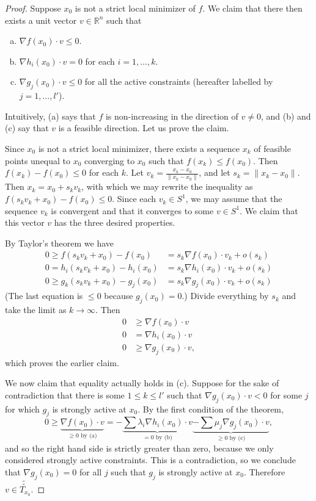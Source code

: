 \documentclass[11pt]{article}
\newcommand{\R}{\mathbb{R}}
\begin{document}
\begin{proof}
Suppose $x_0$ is not a strict local minimizer of $f$. We claim that there then exists a unit vector $v \in \R^n$ such that
\begin{enumerate}[(a)]
\item $\nabla f(x_0) \cdot v \leq 0$.
\item $\nabla h_i(x_0) \cdot v = 0$ for each $i = 1, \dots, k$.
\item $\nabla g_j(x_0) \cdot v \leq 0$ for all the active constraints (hereafter labelled by $j = 1,\dots, l'$).
\end{enumerate}
Intuitively, (a) says that $f$ is non-increasing in the direction of $v \neq 0$, and (b) and (c) say that $v$ is a feasible direction. Let us prove the claim.

Since $x_0$ is not a strict local minimizer, there exists a sequence $x_k$ of feasible points unequal to $x_0$ converging to $x_0$ such that $f(x_k) \leq f(x_0)$. Then $f(x_k) - f(x_0) \leq 0$ for each $k$. Let $v_k = \frac{x_k-x_0}{\|x_k-x_0\|}$, and let $s_k = \|x_k - x_0\|$. Then $x_k = x_0 + s_kv_k$, with which we may rewrite the inequality as $f(s_kv_k + x_0) - f(x_0) \leq 0$. Since each $v_k \in S^1$, we may assume that the sequence $v_k$ is convergent and that it converges to some $v \in S^1$. We claim that this vector $v$ has the three desired properties.

By Taylor's theorem we have
\begin{align*}
0 \geq f(s_kv_k + x_0) - f(x_0) &= s_k \nabla f(x_0) \cdot v_k + o(s_k) \tag{A}\\
0 = h_i(s_kv_k + x_0) - h_i(x_0) &= s_k \nabla h_i(x_0) \cdot v_k + o(s_k) \tag{B} \\
0 \geq g_k(s_kv_k+x_0) - g_j(x_0) &= s_k \nabla g_j(x_0) \cdot v_k + o(s_k) \tag{C}
\end{align*}
(The last equation is $\leq 0$ because $g_j(x_0) = 0$.) Divide everything by $s_k$ and take the limit as $k \to \infty$. Then
\begin{align*}
0 &\geq \nabla f(x_0) \cdot v \tag{a}\\
0 &= \nabla h_i(x_0) \cdot v \tag{b}\\
0 &\geq \nabla g_j(x_0) \cdot v \tag{c},
\end{align*}
which proves the earlier claim.

We now claim that equality actually holds in (c). Suppose for the sake of contradiction that there is some $1 \leq k \leq l'$ such that $\nabla g_j(x_0) \cdot v < 0$ for some $j$ for which $g_j$ is strongly active at $x_0$. By the first condition of the theorem,
\[
0 \geq \underbrace{\nabla f(x_0) \cdot v}_{\text{$\geq 0$ by (a)}} = -\underbrace{\sum \lambda_i \nabla h_i(x_0)\cdot v}_{\text{$=0$ by (b)}} \underbrace{- \sum \mu_j \nabla g_j(x_0)\cdot v}_{\text{$\geq 0$ by (c)}},
\]
and so the right hand side is strictly greater than zero, because we only considered strongly active constraints. This is a contradiction, so we conclude that $\nabla g_j(x_0) = 0$ for all $j$ such that $g_j$ is strongly active at $x_0$. Therefore $v \in \tilde{\tilde{T_{x_0}}}$.


\end{proof}
\end{document}
